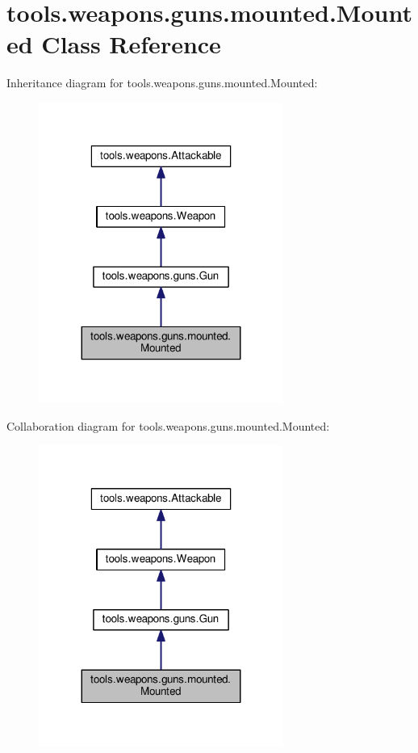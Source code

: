 \hypertarget{classtools_1_1weapons_1_1guns_1_1mounted_1_1_mounted}{}\section{tools.\+weapons.\+guns.\+mounted.\+Mounted Class Reference}
\label{classtools_1_1weapons_1_1guns_1_1mounted_1_1_mounted}


Inheritance diagram for tools.\+weapons.\+guns.\+mounted.\+Mounted\+:\nopagebreak
\begin{figure}[H]
\begin{center}
\leavevmode
\includegraphics[width=227pt]{classtools_1_1weapons_1_1guns_1_1mounted_1_1_mounted__inherit__graph}
\end{center}
\end{figure}


Collaboration diagram for tools.\+weapons.\+guns.\+mounted.\+Mounted\+:\nopagebreak
\begin{figure}[H]
\begin{center}
\leavevmode
\includegraphics[width=227pt]{classtools_1_1weapons_1_1guns_1_1mounted_1_1_mounted__coll__graph}
\end{center}
\end{figure}

